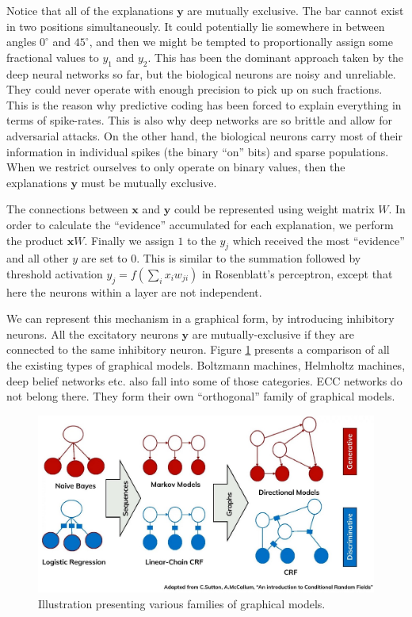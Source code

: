 \documentclass[12pt]{article}
\begin{document}
Notice that all of the explanations $\boldsymbol{y}$ are mutually exclusive.
The bar cannot exist in two positions simultaneously. It could potentially lie somewhere in between angles $0^{\circ}$ and $45^{\circ}$, and then we might be tempted to proportionally assign some fractional values to $y_1$ and $y_2$. This  has been the dominant approach taken by the deep neural networks so far, but the biological neurons are noisy and unreliable. They could never operate with enough precision to pick up on such fractions. This is the reason why predictive coding has been forced to explain everything in terms of spike-rates. This is also why deep networks are so brittle and allow for adversarial attacks. On the other hand, the biological neurons carry most of their information in individual spikes (the binary ``on'' bits) and sparse populations. When we restrict ourselves to only operate on binary values, then the explanations $\boldsymbol{y}$ must be mutually exclusive.

The connections between $\boldsymbol{x}$ and $\boldsymbol{y}$ could be represented using weight matrix $W$. In order to calculate the ``evidence'' accumulated for each explanation, we perform the product $\boldsymbol{x}W$.
Finally we assign $1$ to the $y_j$ which received the most ``evidence'' and all other $y$ are set to $0$. This is similar to the summation followed by threshold activation $y_j=f(\sum_{i}x_{i}w_{ji})$ in Rosenblatt's perceptron, except that here the neurons within a layer are not independent.

We can represent this mechanism in a graphical form, by introducing inhibitory neurons. All the excitatory neurons $\boldsymbol{y}$ are mutually-exclusive if they are connected to the same inhibitory neuron. Figure \ref{fig:graphical_models}
presents a comparison of all the existing types of graphical models. Boltzmann machines, Helmholtz machines, deep belief networks etc. also fall into some of those categories. ECC networks do not belong there. They form their own ``orthogonal'' family of graphical models. 
\begin{figure}[!htbp]
	\centering
	\includegraphics[width=14cm]{crf}
	\caption{Illustration presenting various families of graphical models. }
	\label{fig:graphical_models}
\end{figure} \\
\end{document}
